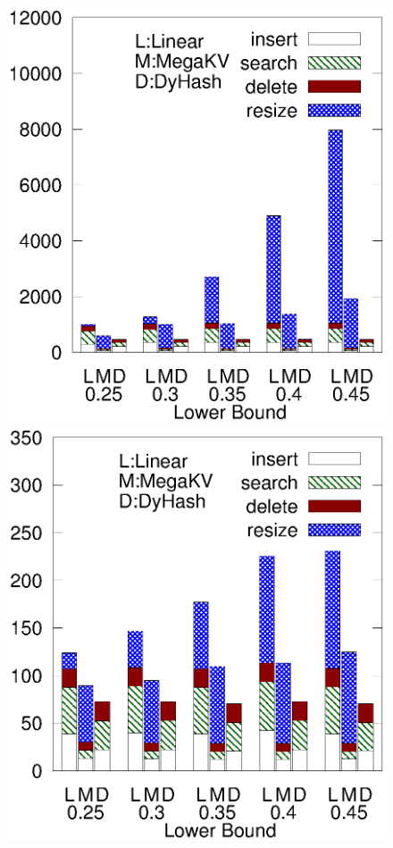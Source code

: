 \begin{figure}[h]
\begin{minipage}{0.19\linewidth}
		\centerline{\dsreddit}
	\end{minipage}
	\begin{minipage}{0.19\linewidth}\centering
		\includegraphics[width=\linewidth]{pic/dynamic/tpch/diff_lower.eps}
		\centerline{\dstpch}
	\end{minipage}
	\begin{minipage}{0.19\linewidth}\centering
		\includegraphics[width=\linewidth]{pic/dynamic/ali/diff_lower.eps}

\end{minipage}
\end{figure}
